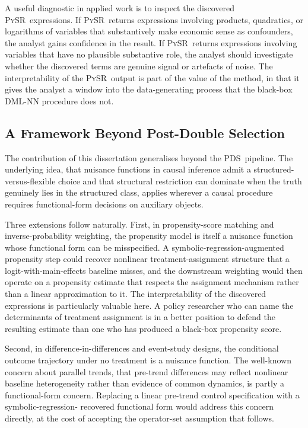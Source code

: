 \documentclass[11pt, a4paper]{article}
\theoremstyle{plain}
\theoremstyle{definition}
\theoremstyle{remark}
\newcommand{\pds}{\textsc{PDS}}
\newcommand{\dml}{\textsc{DML}}
\newcommand{\pysr}{\textsc{PySR}}
\begin{document}
A useful diagnostic in applied work is to inspect the discovered
\pysr\ expressions. If \pysr\ returns expressions involving
products, quadratics, or logarithms of variables that
substantively make economic sense as confounders, the analyst
gains confidence in the result. If \pysr\ returns expressions
involving variables that have no plausible substantive role, the
analyst should investigate whether the discovered terms are
genuine signal or artefacts of noise. The interpretability of the
\pysr\ output is part of the value of the method, in that it
gives the analyst a window into the data-generating process that
the black-box \dml-NN procedure does not.

\subsection{A Framework Beyond Post-Double Selection}

The contribution of this dissertation generalises beyond the
\pds\ pipeline. The underlying idea, that nuisance functions in
causal inference admit a structured-versus-flexible choice and
that structural restriction can dominate when the truth genuinely
lies in the structured class, applies wherever a causal procedure
requires functional-form decisions on auxiliary objects.

Three extensions follow naturally. First, in propensity-score
matching and inverse-probability weighting, the propensity model
is itself a nuisance function whose functional form can be
misspecified. A symbolic-regression-augmented propensity step
could recover nonlinear treatment-assignment structure that a
logit-with-main-effects baseline misses, and the downstream
weighting would then operate on a propensity estimate that
respects the assignment mechanism rather than a linear
approximation to it. The interpretability of the discovered
expressions is particularly valuable here. A policy researcher
who can name the determinants of treatment assignment is in a
better position to defend the resulting estimate than one who
has produced a black-box propensity score.

Second, in difference-in-differences and event-study designs,
the conditional outcome trajectory under no treatment is a
nuisance function. The well-known concern about parallel
trends, that pre-trend differences may reflect nonlinear
baseline heterogeneity rather than evidence of common dynamics,
is partly a functional-form concern. Replacing a linear
pre-trend control specification with a symbolic-regression-%
recovered functional form would address this concern directly,
at the cost of accepting the operator-set assumption that
follows.
\end{document}
